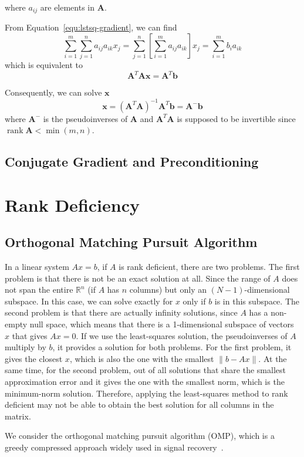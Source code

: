 where $a_{ij}$ are elements in $\mathbf{A}$. 
\par From Equation~\ref{equ:lstsq-gradient}, we can find
\begin{equation}
    \sum_{i=1}^{m} \sum_{j=1}^{n} a_{i j} a_{i k} x_{j}=\sum_{j=1}^{n}\left[\sum_{i=1}^{m} a_{i j} a_{i k}\right] x_{j}=\sum_{i=1}^{m} b_{i} a_{i k}
\end{equation}
which is equivalent to
\begin{equation}
    \mathbf{A}^{T} \mathbf{A} \mathbf{x}=\mathbf{A}^{T} \mathbf{b}
\end{equation}
\par Consequently, we can solve $\mathbf{x}$
\begin{equation}
    \mathbf{x}=\left(\mathbf{A}^{T} \mathbf{A}\right)^{-1} \mathbf{A}^{T} \mathbf{b}=\mathbf{A}^{-} \mathbf{b}
\end{equation}
where $\mathbf{A}^{-}$ is the pseudoinverses of $\mathbf{A}$ and $\mathbf{A}^{T} \mathbf{A}$ is supposed to be invertible since $\operatorname{rank}\mathbf{A} < \operatorname{min}(m, n)$. 


\subsection{Conjugate Gradient and Preconditioning}

\section{Rank Deficiency}
\label{sec:rankdf-sol}
\subsection{Orthogonal Matching Pursuit Algorithm}
In a linear system $Ax=b$, if $A$ is rank deficient, there are two problems. The first problem is that there is not be an exact solution at all. Since the range of $A$ does not span the entire $\mathbb{R}^n$ (if $A$ has $n$ columns) but only an $(N-1)$-dimensional subspace. In this case, we can solve exactly for $x$ only if $b$ is in this subspace. The second problem is that there are actually infinity solutions, since $A$ has a non-empty null space, which means that there is a 1-dimensional subspace of vectors $x$ that gives $Ax=0$. If we use the least-squares solution, the pseudoinverses of $A$ multiply by $b$, it provides a solution for both problems. For the first problem, it gives the closest $x$, which is also the one with the smallest $\|b-Ax\|$. At the same time, for the second problem, out of all solutions that share the smallest approximation error and it gives the one with the smallest norm, which is the minimum-norm solution. Therefore, applying the least-squares method to rank deficient may not be able to obtain the best solution for all columns in the matrix. 
\par We consider the orthogonal matching pursuit algorithm (OMP), which is a greedy compressed approach widely used in signal recovery~\citep{MS:93}.  


